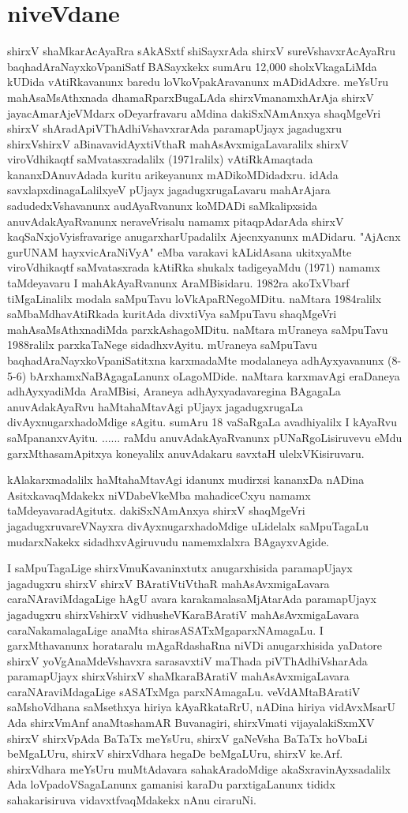 \chapter{niveVdane}

shirxV shaMkarAcAyaRra sAkASxtf shiSayxrAda shirxV sureVshavxrAcAyaRru baqhadAraNayxkoVpaniSatf BASayxkekx sumAru 12,000 sholxVkagaLiMda kUDida vAtiRkavanunx baredu loVkoVpakAravanunx mADidAdxre. meYsUru mahAsaMsAthxnada dhamaRparxBugaLAda shirxVmanamxhArAja shirxV jayacAmarAjeVMdarx oDeyarfravaru aMdina dakiSxNAmAnxya shaqMgeVri shirxV shAradApiVThAdhiVshavxrarAda paramapUjayx jagadugxru shirxVshirxV aBinavavidAyxtiVthaR mahAsAvxmigaLavaralilx shirxV viroVdhikaqtf saMvatasxradalilx (1971ralilx) vAtiRkAmaqtada kananxDAnuvAdada kuritu arikeyanunx mADi\-koMDidadxru. idAda savxlapxdinagaLalilxyeV pUjayx jagadugxrugaLavaru mahArAjara sadudedxVshavanunx audAyaRvanunx koMDADi saMkalipxsida anuvAdakAyaRvanunx neraveVrisalu namamx pitaqpAdarAda shirxV kaqSaNxjoVyisfravarige anugarxharUpadalilx Ajecnxyanunx mADidaru. "AjAcnx gurUNAM hayxvicAraNiVyA" eMba varakavi kALidAsana ukitxyaMte viroVdhikaqtf saMvatasxrada kAtiRka shukalx tadigeyaMdu (1971) namamx taMdeyavaru I mahAkAyaRvanunx AraMBisidaru. 1982ra akoTxVbarf tiMgaLinalilx modala saMpuTavu loVkApaRNegoMDitu. naMtara 1984ralilx saMbaMdhavAtiRkada kuritAda divxtiVya saMpuTavu shaqMgeVri mahAsaMsAthxnadiMda parxkAshagoMDitu. naMtara mUraneya saMpuTavu 1988ralilx parxkaTaNege sidadhx\-vAyitu. mUraneya saMpuTavu baqhadAraNayxkoVpaniSatitxna karxmadaMte modalaneya adhAyxyavanunx (8-5-6) bArxhamxNaBAgagaLanunx oLagoMDide. naMtara karxmavAgi eraDaneya adhAyxyadiMda AraMBisi, Araneya adhAyxyadavaregina BAgagaLa anuvAdakAyaRvu haMtahaMtavAgi pUjayx jagadugxrugaLa divAyxnugarxha\-doMdige sAgitu. sumAru 18 vaSaRgaLa avadhiyalilx I kAyaRvu saMpananx\-vAyitu. ...... raMdu anuvAdakAyaRvanunx pUNaRgoLisiruvevu eMdu garxMtha\-samApitxya koneyalilx anuvAdakaru savxtaH ulelxVKisiruvaru. 

kAlakarxmadalilx haMtahaMtavAgi idanunx mudirxsi kananxDa nADina AsitxkavaqMdakekx niVDabeVkeMba mahadiceCxyu namamx taMdeyavaradAgitutx. dakiSxNAmAnxya shirxV shaqMgeVri jagadugxruvareVNayxra divAyxnugarxhadoMdige uLidelalx saMpuTagaLu \-mudarxNakekx sidadhxvAgiruvudu namemxlalxra BAgayxvAgide.

I saMpuTagaLige shirxVmuKavaninxtutx anugarxhisida paramapUjayx jagadugxru shirxV shirxV BAratiVtiVthaR mahAsAvxmigaLavara caraNAraviMdagaLige hAgU avara karakamala\-saMjAtarAda paramapUjayx jagadugxru shirxVshirxV vidhusheVKaraBAratiV mahAsAvxmigaLavara caraNakamalagaLige anaMta shirasASATxMgaparxNAmagaLu. I garxMthavanunx horataralu mAgaRdashaRna niVDi anugarxhisida yaDatore shirxV yoVgAnaMdeVshavxra sarasavxtiV maThada piVThAdhiVsharAda paramapUjayx shirxVshirxV shaMkaraBAratiV mahAsAvxmigaLavara caraNAraviMdagaLige sASATxMga parxNAmagaLu. veVdAMtaBAratiV saMshoVdhana saMsethxya hiriya kAyaRkataRrU, nADina hiriya vidAvxMsarU Ada shirxVmAnf anaMtashamAR Buvanagiri, shirxVmati vijayalakiSxmXV shirxV shirxVpAda BaTaTx meYsUru, shirxV gaNeVsha BaTaTx hoVbaLi beMgaLUru, shirxV shirxVdhara hegaDe beMgaLUru, shirxV ke.Arf. shirxVdhara meYsUru muMtAdavara sahakAradoMdige akaSxravinAyxsadalilx Ada loVpadoVSagaLanunx gamanisi karaDu parxtigaLanunx tididx sahakarisiruva vidavxtfvaqMdakekx nAnu ciraruNi. 

